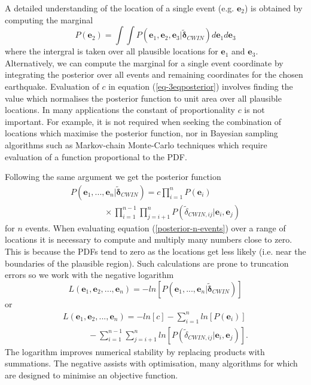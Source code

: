 \documentclass[extra, onecolumn, doublespacing]{gji}
\begin{document}
A detailed understanding of the location of a single event (e.g. $\mathbf{e}_2$) is obtained by computing the
marginal
\begin{equation}
\label{eq:-E2-marginal}
P(\mathbf{e}_2) = \int \int P(\mathbf{e}_1, \mathbf{e}_2, \mathbf{e}_3 | \widetilde{\mathbf{\delta}}_{CWIN}) d\mathbf{e}_1 d\mathbf{e}_3
\end{equation}
where the intergral is taken over all plausible locations for
$\mathbf{e}_1$ and $\mathbf{e}_3$. Alternatively, we can compute the
marginal for a single event coordinate by integrating the posterior
over all events and remaining coordinates for the chosen earthquake.
Evaluation of $c$ in equation (\ref{eq-3eqposterior}) involves
finding the value which normalises the posterior function to unit
area over all plausible locations. In many applications the constant
of proportionality $c$ is not important. For example, it is not
required when seeking the combination of locations which maximise
 the posterior function, nor in Bayesian sampling algorithms such as Markov-chain Monte-Carlo
techniques which require evaluation of a function proportional to the PDF.

Following the same argument we get the posterior function
\begin{equation}
\begin{array}{l}
\label{posterior-n-events}
P(\mathbf{e}_1,...,\mathbf{e}_n | \widetilde{\mathbf{\delta}}_{CWIN}) = c \displaystyle \prod_{i=1}^n P(\mathbf{e}_i) \\
\hspace{4em} \displaystyle  \times \prod_{i=1}^{n-1} \prod_{j=i+1}^n P(\widetilde{\delta}_{CWIN,ij}|\mathbf{e}_i,\mathbf{e}_j)
\end{array}
\end{equation}
for $n$ events. When evaluating equation (\ref{posterior-n-events})
over a range of locations it is necessary to compute and multiply
many numbers close to zero. This is because the PDFs tend to zero as
the locations get less likely (i.e. near the boundaries of the
plausible region). Such calculations are prone to truncation errors
so we work with the negative logarithm
\begin{equation}
\label{eq:-negative-log-part1}
L(\mathbf{e}_1, \mathbf{e}_2, ..., \mathbf{e}_n) = -ln\left[ P(\mathbf{e}_1,...,\mathbf{e}_n | \widetilde{\mathbf{\delta}}_{CWIN} )  \right]
\end{equation}
or
\begin{equation}
\begin{array}{l}
\label{eq:-negative-log}
L(\mathbf{e}_1, \mathbf{e}_2, ..., \mathbf{e}_n) =
-ln\left[ c \right] - \displaystyle \sum_{i=1}^n ln\left[P(\mathbf{e}_i)\right] \\
\hspace{3em} - \displaystyle \sum_{i=1}^{n-1} \sum_{j=i+1}^n ln\left[P(\widetilde{\delta}_{CWIN,ij}|\mathbf{e}_i,\mathbf{e}_j)\right].
\end{array}
\end{equation}
The logarithm improves numerical stability by replacing products with summations. The negative assists with
optimisation, many algorithms for which are designed to minimise an objective function.
\end{document}

